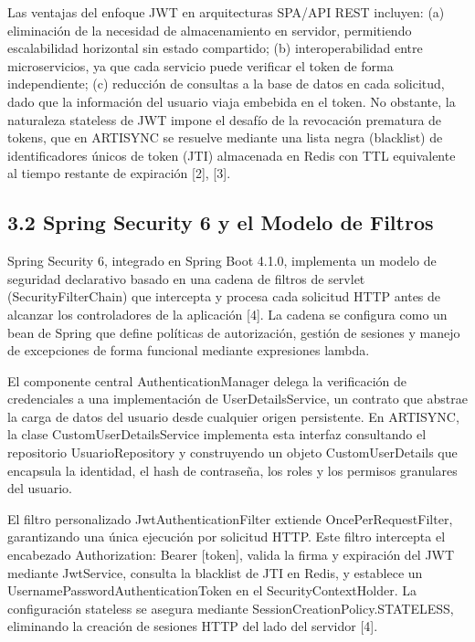 \documentclass[
]{article}
\begin{document}
Las ventajas del enfoque JWT en arquitecturas SPA/API REST incluyen: (a)
eliminación de la necesidad de almacenamiento en servidor, permitiendo
escalabilidad horizontal sin estado compartido; (b) interoperabilidad
entre microservicios, ya que cada servicio puede verificar el token de
forma independiente; (c) reducción de consultas a la base de datos en
cada solicitud, dado que la información del usuario viaja embebida en el
token. No obstante, la naturaleza stateless de JWT impone el desafío de
la revocación prematura de tokens, que en ARTISYNC se resuelve mediante
una lista negra (blacklist) de identificadores únicos de token (JTI)
almacenada en Redis con TTL equivalente al tiempo restante de expiración
{[}2{]}, {[}3{]}.

\subsection{3.2 Spring Security 6 y el Modelo de
Filtros}

Spring Security 6, integrado en Spring Boot 4.1.0, implementa un modelo
de seguridad declarativo basado en una cadena de filtros de servlet
(SecurityFilterChain) que intercepta y procesa cada solicitud HTTP antes
de alcanzar los controladores de la aplicación {[}4{]}. La cadena se
configura como un bean de Spring que define políticas de autorización,
gestión de sesiones y manejo de excepciones de forma funcional mediante
expresiones lambda.

El componente central AuthenticationManager delega la verificación de
credenciales a una implementación de UserDetailsService, un contrato que
abstrae la carga de datos del usuario desde cualquier origen
persistente. En ARTISYNC, la clase CustomUserDetailsService implementa
esta interfaz consultando el repositorio UsuarioRepository y
construyendo un objeto CustomUserDetails que encapsula la identidad, el
hash de contraseña, los roles y los permisos granulares del usuario.

El filtro personalizado JwtAuthenticationFilter extiende
OncePerRequestFilter, garantizando una única ejecución por solicitud
HTTP. Este filtro intercepta el encabezado Authorization: Bearer
{[}token{]}, valida la firma y expiración del JWT mediante JwtService,
consulta la blacklist de JTI en Redis, y establece un
UsernamePasswordAuthenticationToken en el SecurityContextHolder. La
configuración stateless se asegura mediante
SessionCreationPolicy.STATELESS, eliminando la creación de sesiones HTTP
del lado del servidor {[}4{]}.
\end{document}
